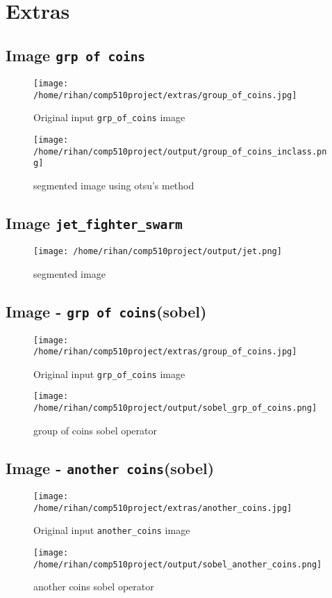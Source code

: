\pagebreak

\section{Extras}
\subsection{Image \texttt{grp of coins}}
\begin{figure}[h!]
  \centering
  \texttt{[image: /home/rihan/comp510project/extras/group\_of\_coins.jpg]}
  \caption{Original input \texttt{grp\_of\_coins} image}
\end{figure}
\begin{figure}[h!]
  \centering
  \texttt{[image: /home/rihan/comp510project/output/group\_of\_coins\_inclass.png]}
  \caption{segmented image using otsu's method}
\end{figure}

\subsection{Image \texttt{jet\_fighter\_swarm}}
\begin{figure}[h!]
  \centering
  \texttt{[image: /home/rihan/comp510project/output/jet.png]}
  \caption{segmented image}
\end{figure}

\pagebreak

\subsection{Image - \texttt{grp of coins}(sobel)}
\begin{figure}[h!]
  \centering
  \texttt{[image: /home/rihan/comp510project/extras/group\_of\_coins.jpg]}
  \caption{Original input \texttt{grp\_of\_coins} image}
\end{figure}
\begin{figure}[h!]
  \centering
  \texttt{[image: /home/rihan/comp510project/output/sobel\_grp\_of\_coins.png]}
  \caption{group of coins sobel operator}
\end{figure}

\pagebreak

\subsection{Image - \texttt{another coins}(sobel) }
\begin{figure}[h!]
  \centering
  \texttt{[image: /home/rihan/comp510project/extras/another\_coins.jpg]}
  \caption{Original input \texttt{another\_coins} image}
\end{figure}
\begin{figure}[h!]
  \centering
  \texttt{[image: /home/rihan/comp510project/output/sobel\_another\_coins.png]}
  \caption{another coins sobel operator}
\end{figure}

